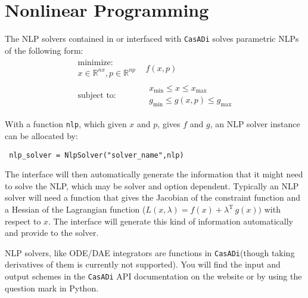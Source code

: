 \documentclass[a4paper,12pt]{book}
\newcommand{\CasADi}{\texttt{CasADi}\xspace}
\begin{document}
\chapter{Nonlinear Programming} \label{ch:nlp}
The NLP solvers contained in or interfaced with \CasADi solves parametric NLPs of the following form:
\begin{equation}
\begin{array}{cc}
\begin{array}{c}
\text{minimize:} \\
x \in \mathbb{R}^{nx}, p \in \mathbb{R}^{np}
\end{array}
&
f(x,p)
\\
\begin{array}{c}
\text{subject to:}
\end{array}
&
\begin{array}{c}
x_{\min} \le x \le x_{\max} \\
g_{\min} \le g(x,p) \le g_{\max}
\end{array}
\end{array}
\end{equation}

With a function \texttt{nlp}, which given $x$ and $p$, gives $f$ and $g$, an NLP solver instance can be allocated by:
\begin{verbatim}
 nlp_solver = NlpSolver("solver_name",nlp)
\end{verbatim}

The interface will then automatically generate the information that it might need to solve the NLP, which may be solver and option dependent. Typically an NLP solver will need a function that gives the Jacobian of the constraint function and a Hessian of the Lagrangian function ($L(x,\lambda) = f(x) + \lambda^{\text{T}} \, g(x))$ with respect to $x$. The interface will generate this kind of information automatically and provide to the solver.

NLP solvers, like ODE/DAE integrators are functions in \CasADi (though taking derivatives of them is currently not supported). You will find the input and output schemes in the \CasADi API documentation on the website or by using the question mark in Python.
\end{document}
